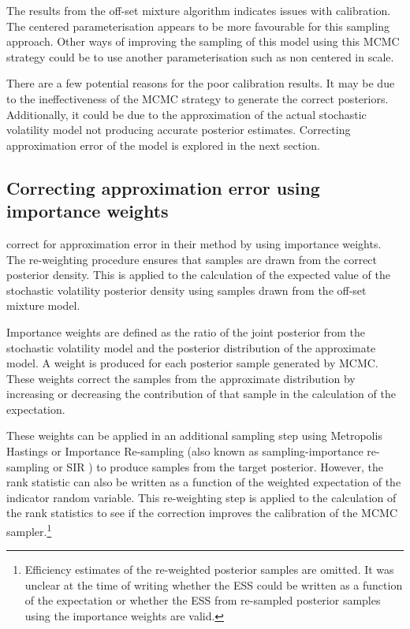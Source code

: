 \documentclass[12pt, a4paper]{article}
\begin{document}
    The results from the off-set mixture algorithm indicates issues with calibration. The centered parameterisation appears to be more favourable for this sampling approach. Other ways of improving the sampling of this model using this MCMC strategy could be to use another parameterisation such as non centered in scale.

    There are a few potential reasons for the poor calibration results. It may be due to the ineffectiveness of the MCMC strategy to generate the correct posteriors. Additionally, it could be due to the approximation of the actual stochastic volatility model not producing accurate posterior estimates. Correcting approximation error of the model is explored in the next section.  

    
    \subsection{Correcting approximation error using importance weights}
    \citet{kim1998stochastic} correct for approximation error in their method by using importance weights. The re-weighting procedure ensures that samples are drawn from the correct posterior density. This is applied to the calculation of the expected value of the stochastic volatility posterior density using samples drawn from the off-set mixture model. 

    Importance weights are defined as the ratio of the joint posterior from the stochastic volatility model and the posterior distribution of the approximate model. A weight is produced for each posterior sample generated by MCMC. These weights correct the samples from the approximate distribution by increasing or decreasing the contribution of that sample in the calculation of the expectation. 

    These weights can be applied in an additional sampling step using Metropolis Hastings or Importance Re-sampling (also known as sampling-importance re-sampling or SIR \citep{gelman2013bayesian}) to produce samples from the target posterior. However, the rank statistic can also be written as a function of the weighted expectation of the indicator random variable. This re-weighting step is applied to the calculation of the rank statistics to see if the correction improves the calibration of the MCMC sampler.\footnote{Efficiency estimates of the re-weighted posterior samples are omitted. It was unclear at the time of writing whether the ESS could be written as a function of the expectation or whether the ESS from re-sampled posterior samples using the importance weights are valid.}
\end{document}
